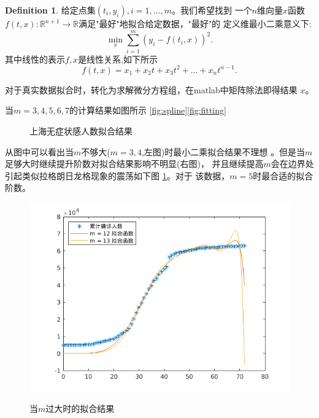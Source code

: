 \documentclass[a4paper]{book}
\numberwithin{equation}{chapter}
\theoremstyle{definition}
\newtheorem{defn}[thm]{Definition}
\begin{document}
\begin{defn}
  给定点集$(t_i, y_i), i = 1,\ldots, m$。我们希望找到
  一个$n$维向量$x$函数$f(t, x) : \mathbb{R}^{n + 1} 
  \rightarrow \mathbb{R}$满足"最好"地拟合给定数据，"最好"的
  定义维最小二乘意义下:
  \[\min_{x} \sum_{i = 1}^m (y_i - f(t_i, x))^2.\]
  其中线性的表示$f, x$是线性关系,如下所示
  \[ f(t, x) = x_1 + x_2 t + x_3 t^2 + \ldots + x_n t^{n - 1}.\]
\end{defn}

对于真实数据拟合时，转化为求解微分方程组，在matlab中矩阵除法即得结果
$x$。

当$m = 3, 4, 5, 6, 7$的计算结果如图所示
\ref{fig:spline}\ref{fig:fitting}
\begin{figure}
  \centering
  \hfill
  \caption{上海无症状感人数拟合结果}
\end{figure}
  从图中可以看出当$m$不够大($m = 3, 4$,左图)时最小二乘拟合结果不理想
  。但是当$m$足够大时继续提升阶数对拟合结果影响不明显(右图)，
  并且继续提高$m$会在边界处引起类似拉格朗日龙格现象的震荡如下图
  \ref{mmmm}。对于
  该数据，$m=5$时最合适的拟合阶数。
  \begin{figure}
    \centering
    \includegraphics[width=0.43\linewidth]{m1011.png}
    \label{mmmm}
    \caption{当$m$过大时的拟合结果}
  \end{figure}
  
\end{document}
